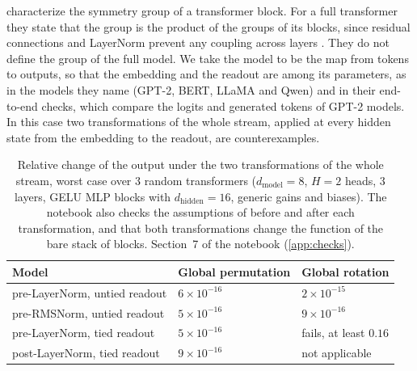 \documentclass[10pt]{article}
\theoremstyle{definition}
\theoremstyle{remark}
\newcommand{\dm}{d_{\mathrm{model}}}
\newcommand{\dhid}{d_{\mathrm{hidden}}}
\begin{document}
\citet{wang2025gauge} characterize the symmetry group of a transformer block. For a full transformer they state that the group is the product of the groups of its blocks, since residual connections and LayerNorm prevent any coupling across layers \citep[Theorem~7]{wang2025gauge}. They do not define the group of the full model. We take the model to be the map from tokens to outputs, so that the embedding and the readout are among its parameters, as in the models they name (GPT-2, BERT, LLaMA and Qwen) and in their end-to-end checks, which compare the logits and generated tokens of GPT-2 models. In this case two transformations of the whole stream, applied at every hidden state from the embedding to the readout, are counterexamples.

\begin{table}[ht]
\centering\small
\caption{Relative change of the output under the two transformations of the whole stream, worst case over $3$ random transformers ($\dm = 8$, $H = 2$ heads, $3$ layers, GELU MLP blocks with $\dhid = 16$, generic gains and biases). The notebook also checks the assumptions of \citet{wang2025gauge} before and after each transformation, and that both transformations change the function of the bare stack of blocks. Section~7 of the notebook (\cref{app:checks}).}
\label{tab:product}
\begin{tabular}{lll}
\toprule
Model & Global permutation & Global rotation \\
\midrule
pre-LayerNorm, untied readout & $6\times10^{-16}$ & $2\times10^{-15}$ \\
pre-RMSNorm, untied readout & $5\times10^{-16}$ & $9\times10^{-16}$ \\
pre-LayerNorm, tied readout & $5\times10^{-16}$ & fails, at least $0.16$ \\
post-LayerNorm, tied readout & $9\times10^{-16}$ & not applicable \\
\bottomrule
\end{tabular}
\end{table}
\end{document}

